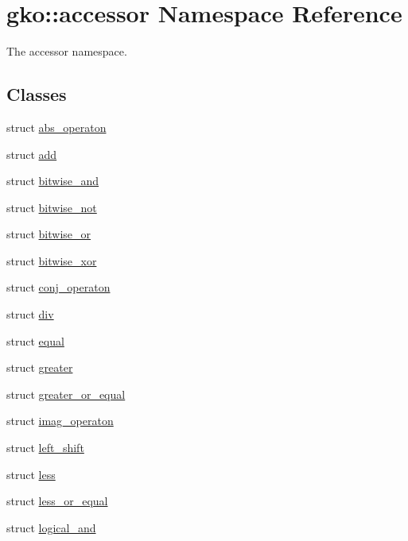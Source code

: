 \hypertarget{namespacegko_1_1accessor}{}\section{gko\+:\+:accessor Namespace Reference}
\label{namespacegko_1_1accessor}


The accessor namespace.  


\subsection*{Classes}
\begin{DoxyCompactItemize}
\item 
struct \hyperlink{structgko_1_1accessor_1_1abs__operaton}{abs\+\_\+operaton}
\item 
struct \hyperlink{structgko_1_1accessor_1_1add}{add}
\item 
struct \hyperlink{structgko_1_1accessor_1_1bitwise__and}{bitwise\+\_\+and}
\item 
struct \hyperlink{structgko_1_1accessor_1_1bitwise__not}{bitwise\+\_\+not}
\item 
struct \hyperlink{structgko_1_1accessor_1_1bitwise__or}{bitwise\+\_\+or}
\item 
struct \hyperlink{structgko_1_1accessor_1_1bitwise__xor}{bitwise\+\_\+xor}
\item 
struct \hyperlink{structgko_1_1accessor_1_1conj__operaton}{conj\+\_\+operaton}
\item 
struct \hyperlink{structgko_1_1accessor_1_1div}{div}
\item 
struct \hyperlink{structgko_1_1accessor_1_1equal}{equal}
\item 
struct \hyperlink{structgko_1_1accessor_1_1greater}{greater}
\item 
struct \hyperlink{structgko_1_1accessor_1_1greater__or__equal}{greater\+\_\+or\+\_\+equal}
\item 
struct \hyperlink{structgko_1_1accessor_1_1imag__operaton}{imag\+\_\+operaton}
\item 
struct \hyperlink{structgko_1_1accessor_1_1left__shift}{left\+\_\+shift}
\item 
struct \hyperlink{structgko_1_1accessor_1_1less}{less}
\item 
struct \hyperlink{structgko_1_1accessor_1_1less__or__equal}{less\+\_\+or\+\_\+equal}
\item 
struct \hyperlink{structgko_1_1accessor_1_1logical__and}{logical\+\_\+and}
\item 

\end{DoxyCompactItemize}
